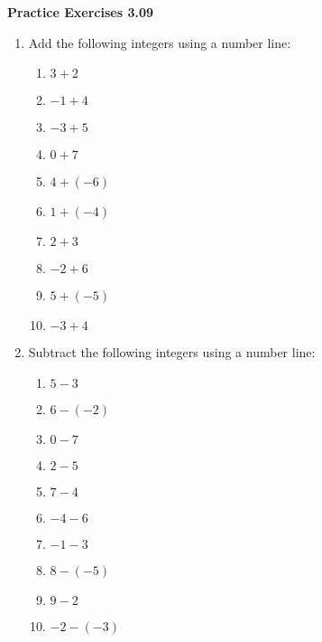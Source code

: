 \vspace{0.3ex}
\noindent\textbf{Practice Exercises 3.09}

\vspace{0.2ex}

\begin{enumerate}[noitemsep, label = \color{blue}\Alph*. ]
\item Add the following integers using a number line:
\begin{multicols}{4}
\begin{enumerate}[noitemsep, label = \color{blue}\arabic*. ]
    \item \(3 + 2\)
    \item \(-1 + 4\)
    \item \(-3 + 5\)
    \item \(0 + 7\)
    \item \(4 + (-6)\)
    \item \(1 + (-4)\)
    \item \(2 + 3\)
    \item \(-2 + 6\)
    \item \(5 + (-5)\)
    \item \(-3 + 4\)
\end{enumerate}
\end{multicols}

\item Subtract the following integers using a number line:
\begin{multicols}{3}
\begin{enumerate}[noitemsep, label = \color{blue}\arabic*. ]
    \item \(5 - 3\)
    \item \(6 - (-2)\)
    \item \(0 - 7\)
    \item \(2 - 5\)
    \item \(7 - 4\)
    \item \(-4 - 6\)
    \item \(-1 - 3\)
    \item \(8 - (-5)\)
    \item \(9 - 2\)
    \item \(-2 - (-3)\)
\end{enumerate}
\end{multicols}
\end{enumerate}
